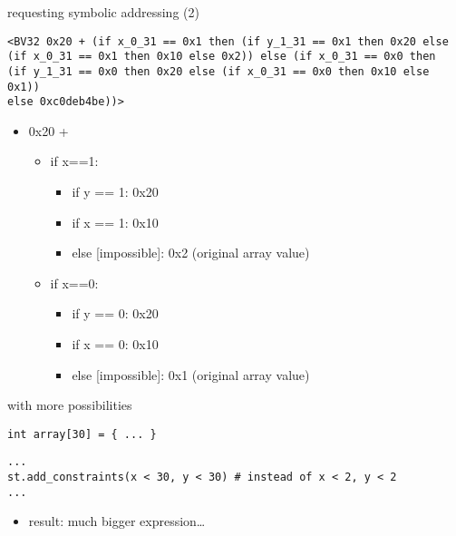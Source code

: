\begin{frame}[fragile]{requesting symbolic addressing (2)}
\begin{Verbatim}[fontsize=\fontsize{10}{11}]
<BV32 0x20 + (if x_0_31 == 0x1 then (if y_1_31 == 0x1 then 0x20 else
(if x_0_31 == 0x1 then 0x10 else 0x2)) else (if x_0_31 == 0x0 then
(if y_1_31 == 0x0 then 0x20 else (if x_0_31 == 0x0 then 0x10 else 0x1))
else 0xc0deb4be))>
\end{Verbatim}
\hrulefill
\begin{itemize}
\item 0x20 + 
    \begin{itemize}
    \item if x==1:
        \begin{itemize}
        \item if y == 1: 0x20
        \item if x == 1: 0x10 
        \item else [impossible]: 0x2 (original array value)
        \end{itemize}
    \item if x==0:
        \begin{itemize}
        \item if y == 0: 0x20
        \item if x == 0: 0x10 
        \item else [impossible]: 0x1 (original array value)
        \end{itemize}
    \end{itemize}
\end{itemize}
\end{frame}

\begin{frame}[fragile]{with more possibilities}
\begin{Verbatim}[fontsize=\small]
int array[30] = { ... }
\end{Verbatim}
\begin{Verbatim}[fontsize=\small]
...
st.add_constraints(x < 30, y < 30) # instead of x < 2, y < 2
...
\end{Verbatim}
\begin{itemize}
\item result: much bigger expression\ldots
\end{itemize}
\end{frame}

